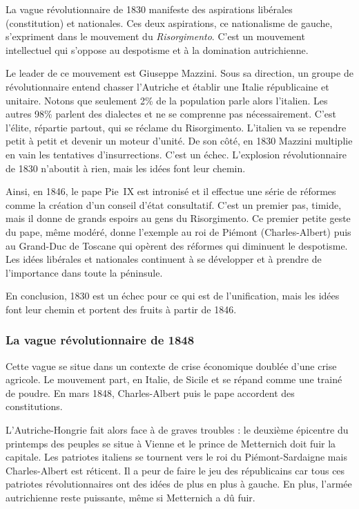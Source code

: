 \documentclass[12pt]{report}
\begin{document}
La vague révolutionnaire de 1830 manifeste des aspirations libérales (constitution) et nationales.
Ces deux aspirations, ce nationalisme de gauche, s'expriment dans  le mouvement du \emph{Risorgimento}.
C'est un mouvement intellectuel qui s’oppose au despotisme et à la domination autrichienne.

Le leader de ce mouvement est Giuseppe Mazzini.
Sous sa direction, un groupe de révolutionnaire entend chasser l’Autriche et établir une Italie républicaine et unitaire.
Notons que seulement 2\% de la population parle alors l’italien.
Les autres 98\% parlent des dialectes et ne se comprenne pas nécessairement.
C’est l’élite, répartie partout, qui se réclame du Risorgimento.
L’italien va se rependre petit à petit et devenir un moteur d’unité.
De son côté, en 1830 Mazzini multiplie en vain les tentatives d’insurrections.
C’est un échec.
L'explosion révolutionnaire de 1830 n'aboutit à rien, mais les idées font leur chemin.

Ainsi, en 1846, le pape Pie~IX est intronisé et il effectue une série de réformes comme la création d'un conseil d’état consultatif.
C’est un premier pas, timide, mais il donne de grands espoirs au gens du Risorgimento. 
Ce premier petite geste du pape, même modéré, donne l’exemple au roi de Piémont (Charles-Albert) puis au Grand-Duc de Toscane qui opèrent des réformes qui diminuent le despotisme.
Les idées libérales et nationales continuent à se développer et à prendre de l’importance dans toute la péninsule.

En conclusion, 1830 est un échec pour ce qui est de l'unification, mais les idées font leur chemin et portent des fruits à partir de 1846.

\subsubsection{La vague révolutionnaire de 1848}

Cette vague se situe dans un contexte de crise économique doublée d’une crise agricole. 
Le mouvement part, en Italie, de Sicile et se répand comme une trainé de poudre. 
En mars 1848, Charles-Albert puis le pape accordent des constitutions.

L’Autriche-Hongrie fait alors face à de graves troubles : le deuxième épicentre du printemps des peuples se situe à Vienne et le prince de Metternich doit fuir la capitale. 
Les patriotes italiens se tournent vers le roi du Piémont-Sardaigne mais Charles-Albert est réticent. 
Il a peur de faire le jeu des républicains car tous ces patriotes révolutionnaires ont des idées de plus en plus à gauche.
En plus, l’armée autrichienne reste puissante, même si Metternich a dû fuir.
\end{document}
